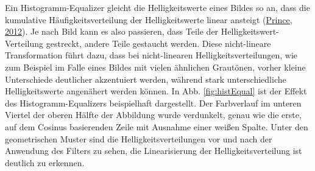 \documentclass[
  12pt,
  openany]{book}
\begin{document}
Ein Histogramm-Equalizer gleicht die Helligkeitswerte eines Bildes so an, dass die kumulative Häufigkeitsverteilung der Helligkeitswerte linear ansteigt (\protect\hyperlink{ref-princePartIVPreprocessing2012}{Prince, 2012}). Je nach Bild kann es also passieren, dass Teile der Helligkeitswert-Verteilung gestreckt, andere Teile gestaucht werden.
Diese nicht-lineare Transformation führt dazu, dass bei nicht-linearen Helligkeitsverteilungen, wie zum Beispiel im Falle eines Bildes mit vielen ähnlichen Grautönen, vorher kleine Unterschiede deutlicher akzentuiert werden, während stark unterschiedliche Helligkeitswerte angenähert werden können.
In Abb. \ref{fig:histEqual} ist der Effekt des Histogramm-Equalizers beispielhaft dargestellt. Der Farbverlauf im unteren Viertel der oberen Hälfte der Abbildung wurde verdunkelt, genau wie die erste, auf dem Cosinus basierenden Zeile mit Ausnahme einer weißen Spalte. Unter den geometrischen Muster sind die Helligkeitsverteilungen vor und nach der Anwendung des Filters zu sehen, die Linearisierung der Helligkeitsverteilung ist deutlich zu erkennen.
\end{document}
